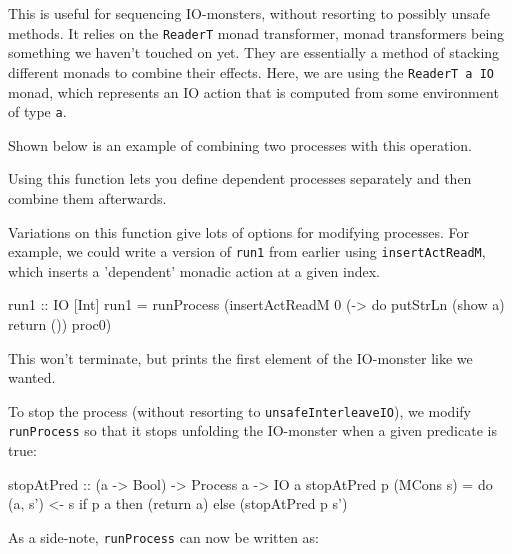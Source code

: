 \documentclass{article}
\begin{document}
This is useful for sequencing IO-monsters, without resorting to possibly unsafe methods. It relies on the \verb+ReaderT+ monad transformer, monad transformers being something we haven't touched on yet. They are essentially a method of stacking different monads to combine their effects. Here, we are using the \verb+ReaderT a IO+ monad, which represents an IO action that is computed from some environment of type \verb+a+. 

Shown below is an example of combining two processes with this operation.


Using this function lets you define dependent processes separately and then combine them afterwards. 

Variations on this function give lots of options for modifying processes. For example, we could write a version of \verb+run1+ from earlier using \verb+insertActReadM+, which inserts a 'dependent' monadic action at a given index.

\begin{haskell}
run1 :: IO [Int]
run1 = runProcess (insertActReadM 0 (\a -> 
	do putStrLn (show a)
	   return ()) proc0)
\end{haskell}

This won't terminate, but prints the first element of the IO-monster like we wanted. 

To stop the process (without resorting to \verb+unsafeInterleaveIO+), we modify \verb+runProcess+ so that it stops unfolding the IO-monster when a given predicate is true:

\begin{haskell}
stopAtPred :: (a -> Bool) -> Process a -> IO a
stopAtPred p (MCons s) = do (a, s') <- s
                            if p a then (return a) else (stopAtPred p s')
\end{haskell}
 
As a side-note, \verb+runProcess+ can now be written as:
 
\end{document}
